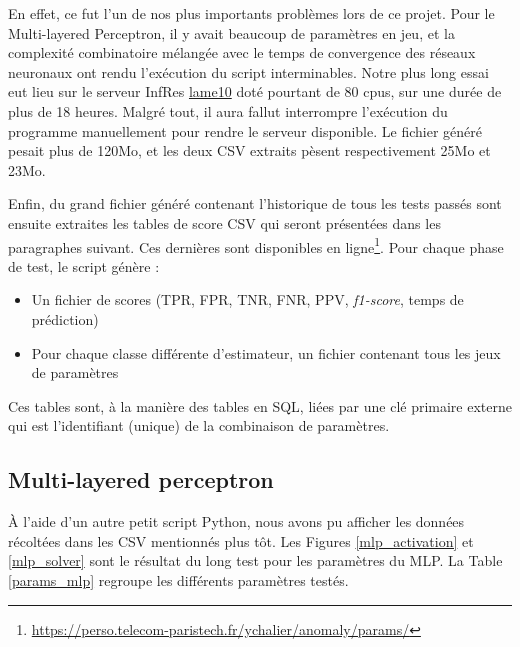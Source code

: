 \documentclass[a4paper]{report}
\begin{document}
En effet, ce fut l'un de nos plus importants problèmes lors de ce projet. Pour le Multi-layered Perceptron, il y avait beaucoup de paramètres en jeu, et la complexité combinatoire mélangée avec le temps de convergence des réseaux neuronaux ont rendu l'exécution du script interminables. Notre plus long essai eut lieu sur le serveur InfRes \href{http://lame10.enst.fr}{lame10} doté pourtant de 80 cpus, sur une durée de plus de 18 heures. Malgré tout, il aura fallut interrompre l'exécution du programme manuellement pour rendre le serveur disponible. Le fichier généré pesait plus de 120Mo, et les deux CSV extraits pèsent respectivement 25Mo et 23Mo.

Enfin, du grand fichier généré contenant l'historique de tous les tests passés sont ensuite extraites les tables de score CSV qui seront présentées dans les paragraphes suivant. Ces dernières sont disponibles en ligne\footnote{\url{https://perso.telecom-paristech.fr/ychalier/anomaly/params/}}. Pour chaque phase de test, le script génère :
\begin{itemize}
\item Un fichier de scores (TPR, FPR, TNR, FNR, PPV, \emph{f1-score}, temps de prédiction)
\item Pour chaque classe différente d'estimateur, un fichier contenant tous les jeux de paramètres
\end{itemize}
Ces tables sont, à la manière des tables en SQL, liées par une clé primaire externe qui est l'identifiant (unique) de la combinaison de paramètres.


\subsection{Multi-layered perceptron}

À l'aide d'un autre petit script Python, nous avons pu afficher les données récoltées dans les CSV mentionnés plus tôt. Les Figures \ref{mlp_activation} et \ref{mlp_solver} sont le résultat du long test pour les paramètres du MLP. La Table \ref{params_mlp} regroupe les différents paramètres testés.
\end{document}
